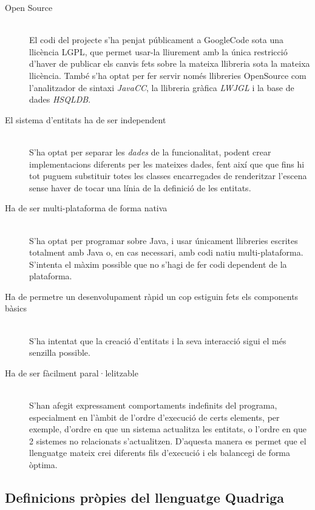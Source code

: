 \begin{description}
  \item[Open Source] \hfill \\
    El codi del projecte s'ha penjat públicament a GoogleCode sota una llicència LGPL, que permet usar-la lliurement amb la única restricció d'haver de publicar els canvis fets sobre la mateixa llibreria sota la mateixa llicència. També s'ha optat per fer servir només llibreries OpenSource com l'analitzador de sintaxi {\em JavaCC}, la llibreria gràfica {\em LWJGL} i la base de dades {\em HSQLDB}.
    
  \item[El sistema d'entitats ha de ser independent] \hfill \\
    S'ha optat per separar les {\em dades} de la funcionalitat, podent crear implementacions diferents per les mateixes dades, fent així que que fins hi tot puguem substituir totes les classes encarregades de renderitzar l'escena sense haver de tocar una línia de la definició de les entitats.
    
  \item[Ha de ser multi-plataforma de forma nativa] \hfill \\
    S'ha optat per programar sobre Java, i usar únicament llibreries escrites totalment amb Java o, en cas necessari, amb codi natiu multi-plataforma. S'intenta el màxim possible que no s'hagi de fer codi dependent de la plataforma.
    
  \item[Ha de permetre un desenvolupament ràpid un cop estiguin fets els components bàsics] \hfill \\
    S'ha intentat que la creació d'entitats i la seva interacció sigui el més senzilla possible.
    
  \item[Ha de ser fàcilment paral·lelitzable] \hfill \\
    S'han afegit expressament comportaments indefinits del programa, especialment en l'àmbit de l'ordre d'execució de certs elements, per exemple, d'ordre en que un sistema actualitza les entitats, o l'ordre en que 2 sistemes no relacionats s'actualitzen. D'aquesta manera es permet que el llenguatge mateix crei diferents fils d'execució i els balancegi de forma òptima.
\end{description}

\subsection{Definicions pròpies del llenguatge Quadriga}

